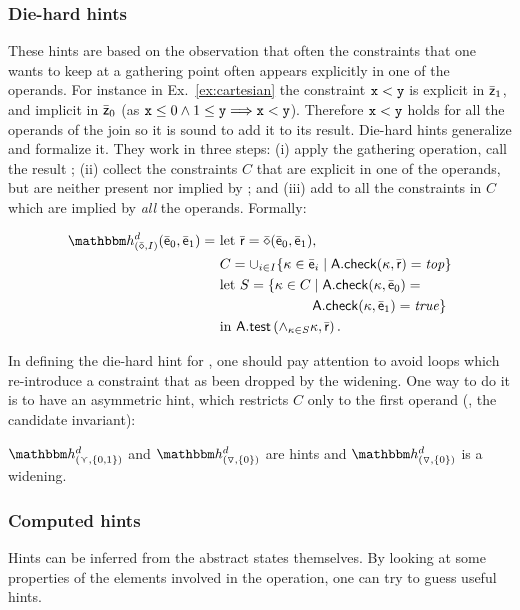 \documentclass[sttt]{svjour}
\newcommand{\sopra}{}
\begin{document}
\subsubsection{Die-hard hints}
These hints are based on the observation that often the constraints that one wants to keep at a  gathering point  often appears explicitly in one of the operands.
For instance in Ex.~\ref{ex:cartesian} the constraint $\mathtt{x} < \mathtt{y}$ is explicit in $\bar{\mathsf{\mathsf{z}}}_1$, and implicit in $\bar{\mathsf{\mathsf{z}}}_0$ (as $\mathtt{x} \leq 0 \wedge 1 \leq \mathtt{y} \Longrightarrow \mathtt{x} < \mathtt{y}$).
Therefore $\mathtt{x} < \mathtt{y}$ holds for all the operands of the join so it is sound to add it to its result.
Die-hard hints generalize and formalize it.
They work in three steps: (i) apply the gathering operation, call the result ; (ii) collect the constraints $C$ that are explicit in one of the operands, but are neither present nor implied by ; and (iii) add to  all the constraints in $C$ which are implied by \emph{all} the operands.
Formally:

\begin{small}
  \[
  \begin{split}
    \hint{(\ael{\op}, I)}^{d}(\ael{e}_0, \ael{e}_1) = \ &  \mathrm{let}\ \ael{r} = \ael{\op}(\ael{e}_0, \ael{e}_1),\\
    & C = \cup_{i \in I }\{ \kappa \in \ael{e}_i \mid \adom{A}.\checkif(\kappa, \ael{r}) = \mathit{top} \} \\
    & \mathrm{let}\ S = \{ \kappa \in C \mid \adom{A}.\checkif(\kappa, \ael{e}_0) = \\
    & \phantom{ S = \{ \kappa \in C \mid} \quad \adom{A}.\checkif(\kappa, \ael{e}_1) = \mathit{true} \} \\
& \mathrm{in}\ \adom{A}.\atest\left(\wedge_{\kappa \in S} \kappa, \ael{r}\right).
\end{split}
\]
\end{small}
\sopra

In defining the die-hard hint for \widening, one should pay attention
to avoid loops which re-introduce a constraint that as been dropped by
the widening. 
One way to do it is to have an asymmetric hint, which restricts $C$
only to the first operand (\eg, the candidate invariant):
\begin{lemma}
$\hint{(\cjoin, \{ 0, 1 \})}^{d}$  and $\hint{(\widening, \{ 0 \})
}^{d}$ are hints and  $\hint{(\widening, \{0\})}^{d}$ is a widening.
\end{lemma}


\subsubsection{Computed hints}
\label{sec:Templatehints}
Hints can be inferred from the abstract states themselves. 
By looking at some properties of the elements involved in the
operation, one can try to guess useful hints. 
\end{document}

